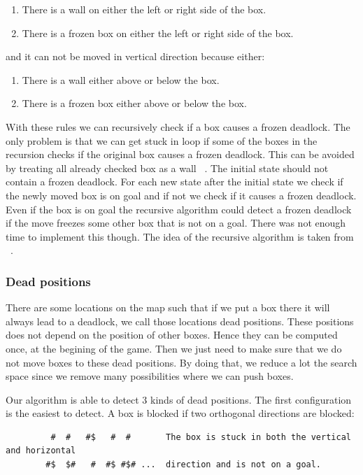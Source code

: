 \documentclass[a4paper,10pt]{article}
\begin{document}
	    \begin{enumerate}[I]
                \item There is a wall on either the left or right side of the box.
                \item There is a frozen box on either the left or right side of the box.
            \end{enumerate}
            and it can not be moved in vertical direction because either: 
            \begin{enumerate}[I]
                \item There is a wall either above or below the box.
                \item There is a frozen box either above or below the box.
            \end{enumerate}
            With these rules we can recursively check if a box causes a frozen deadlock.  
            The only problem is that we can get stuck in loop if some of the boxes in the recursion checks if the original box causes a frozen deadlock.  
            This can be avoided by treating all already checked box as a wall ~\cite{frozen_deadlock}.    
            The initial state should not contain a frozen deadlock.  
            For each new state after the initial state we check if the newly moved box is on goal and if not we check if it causes a frozen deadlock. 
            Even if the box is on goal the recursive algorithm could detect a frozen deadlock if the move freezes some other box that is not on a goal.  
            There was not enough time to implement this though.  
            The idea of the recursive algorithm is taken from  ~\cite{frozen_deadlock}.
          \subsubsection{Dead positions}
            There are some locations on the map such that if we put a box there it will always lead to a deadlock, we call those locations dead positions.  
			These positions does not depend on the position of other boxes.
			Hence they can be computed once, at the begining of the game.
            Then we just need to make sure that we do not move boxes to these dead positions. 
            By doing that, we reduce a lot the search space since we remove many possibilities where we can push boxes.
			

			Our algorithm is able to detect 3 kinds of dead positions.
			The first configuration is the easiest to detect. A box is blocked if two orthogonal directions are blocked:
            \begin{verbatim}
	     #  #   #$   #  #       The box is stuck in both the vertical and horizontal
	    #$  $#   #  #$ #$# ...  direction and is not on a goal.
			\end{verbatim}
\end{document}
